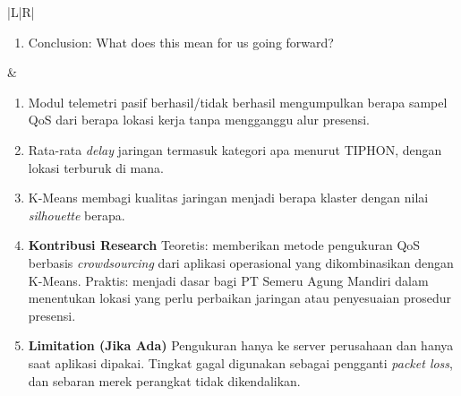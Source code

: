 \documentclass[11pt,a4paper]{article}
\begin{document}
\begin{longtable}{|L|R|}
\begin{enumerate}[label=\arabic*.,start=7]
\item Conclusion: What does this mean for us going forward?
\end{enumerate}
&
\begin{enumerate}[label=\arabic*.]
\item Modul telemetri pasif berhasil/tidak berhasil mengumpulkan berapa sampel QoS dari berapa lokasi kerja tanpa mengganggu alur presensi.
\item Rata-rata \textit{delay} jaringan termasuk kategori apa menurut TIPHON, dengan lokasi terburuk di mana.
\item K-Means membagi kualitas jaringan menjadi berapa klaster dengan nilai \textit{silhouette} berapa.
\item \textbf{Kontribusi Research}\newline
Teoretis: memberikan metode pengukuran QoS berbasis \textit{crowdsourcing} dari aplikasi operasional yang dikombinasikan dengan K-Means. Praktis: menjadi dasar bagi PT Semeru Agung Mandiri dalam menentukan lokasi yang perlu perbaikan jaringan atau penyesuaian prosedur presensi.
\item \textbf{Limitation (Jika Ada)}\newline
Pengukuran hanya ke server perusahaan dan hanya saat aplikasi dipakai. Tingkat gagal digunakan sebagai pengganti \textit{packet loss}, dan sebaran merek perangkat tidak dikendalikan.
\end{enumerate}
\\ \hline
\end{longtable}
\end{document}
